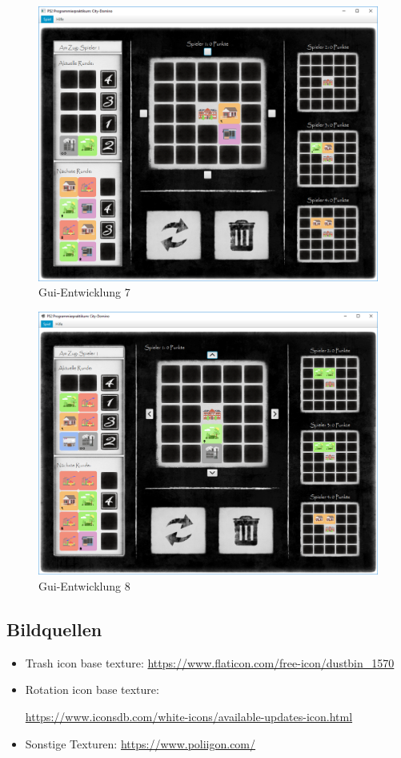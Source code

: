 \begin{figure}
	\centering
	\includegraphics{anhang/pics/Main121018}
	\caption{Gui-Entwicklung 7}
	\label{fig:guiEnwicklung7}
\end{figure}

\begin{figure}
	\centering
	\includegraphics{anhang/pics/Main141018}
	\caption{Gui-Entwicklung 8}
	\label{fig:guiEnwicklung8}
\end{figure}

\FloatBarrier

\subsection{Bildquellen}
\begin{itemize}
	\item Trash icon base texture: \url{https://www.flaticon.com/free-icon/dustbin_1570}
	\item Rotation icon base texture: 
	
	\url{https://www.iconsdb.com/white-icons/available-updates-icon.html}
	\item Sonstige Texturen: \url{https://www.poliigon.com/}
\end{itemize}